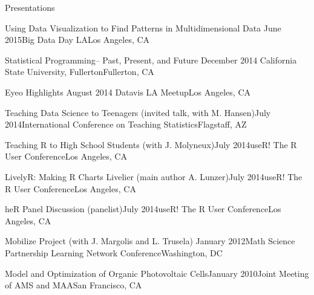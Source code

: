 \documentclass{resume} %
\begin{document}
\begin{rSection}{Presentations}
\begin{sSubsection}{Using Data Visualization to Find Patterns in Multidimensional Data}{ }{June 2015}{Big Data Day LA}{Los Angeles, CA}
\end{sSubsection}

\begin{sSubsection}{Statistical Programming-- Past, Present, and Future}{ }{December 2014 }{California State University, Fullerton}{Fullerton, CA}
\end{sSubsection}

\begin{sSubsection}{Eyeo Highlights}{ }{August 2014 }{Datavis LA Meetup}{Los Angeles, CA}
\end{sSubsection}

\begin{sSubsection}{Teaching Data Science to Teenagers}{ (invited talk, with M. Hansen)}{July 2014}{International Conference on Teaching Statistics}{Flagstaff, AZ}
\end{sSubsection}

\begin{sSubsection}{Teaching R to High School Students}{ (with J. Molyneux)}{July 2014}{useR! The R User Conference}{Los Angeles, CA}
\end{sSubsection}

\begin{sSubsection}{LivelyR: Making R Charts Livelier}{ (main author A. Lunzer)}{July 2014}{useR! The R User Conference}{Los Angeles, CA}
\end{sSubsection}

\begin{sSubsection}{heR Panel Discussion}{ (panelist)}{July 2014}{useR! The R User Conference}{Los Angeles, CA}
\end{sSubsection}

\begin{sSubsection}{Mobilize Project}{ (with J. Margolis and L. Trusela)} {January 2012}{Math Science Partnership Learning Network Conference}{Washington, DC}
\end{sSubsection}

\begin{sSubsection}{Model and Optimization of Organic Photovoltaic Cells}{}{January 2010}{Joint Meeting of AMS and MAA}{San Francisco, CA}
\end{sSubsection}
\end{rSection}
\end{document}
